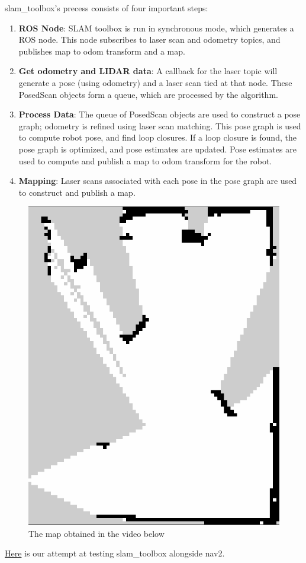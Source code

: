 slam\_toolbox's precess consists of four important steps:
\begin{enumerate}
    \item \textbf{\large ROS Node}: SLAM toolbox is run in synchronous mode, which generates a ROS node. This node subscribes to laser scan and odometry topics, and publishes map to odom transform and a map.

    \item \textbf{\large Get odometry and LIDAR data}: A callback for the laser topic will generate a pose (using odometry) and a laser scan tied at that node. These PosedScan objects form a queue, which are processed by the algorithm.

    \item \textbf{\large Process Data}: The queue of PosedScan objects are used to construct a pose graph; odometry is refined using laser scan matching. This pose graph is used to compute robot pose, and find loop closures. If a loop closure is found, the pose graph is optimized, and pose estimates are updated. Pose estimates are used to compute and publish a map to odom transform for the robot.

    \item \textbf{\large Mapping}: Laser scans associated with each pose in the pose graph are used to construct and publish a map.
\end{enumerate}
\begin{figure}[H]
	\centering
	\includegraphics[width=0.8\linewidth]{figures/MAP.png}
	\caption{The map obtained in the video below}
	\label{fig:MAP}
\end{figure}
\href{https://youtu.be/gvVIIlhwI-I}{Here} is our attempt at testing slam\_toolbox alongside nav2. 
